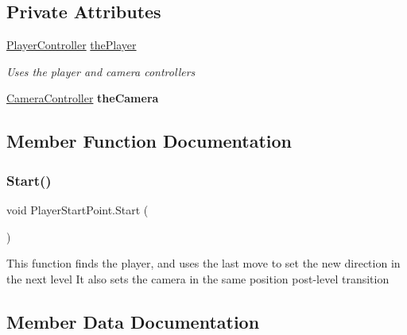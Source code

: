 \subsection*{Private Attributes}
\begin{DoxyCompactItemize}
\item 
\mbox{\hyperlink{class_player_controller}{Player\+Controller}} \mbox{\hyperlink{class_player_start_point_a4242b06d9f40b1729a83ffb3508772c4}{the\+Player}}
\begin{DoxyCompactList}\small\item\em Uses the player and camera controllers \end{DoxyCompactList}\item 
\mbox{\label{class_player_start_point_af4e288ae79aa800dfeb6ca7013052db1}} 
\mbox{\hyperlink{class_camera_controller}{Camera\+Controller}} {\bfseries the\+Camera}
\end{DoxyCompactItemize}


\subsection{Member Function Documentation}
\mbox{\label{class_player_start_point_a54401d0571e76bb7a7a3161a0147b787}} 
\subsubsection{\texorpdfstring{Start()}{Start()}}
{\footnotesize\ttfamily void Player\+Start\+Point.\+Start (\begin{DoxyParamCaption}{ }\end{DoxyParamCaption})\hspace{0.3cm}{\ttfamily [private]}}



This function finds the player, and uses the last move to set the new direction in the next level It also sets the camera in the same position post-\/level transition 



\subsection{Member Data Documentation}
\mbox{\label{class_player_start_point_abdc8a9f45e6064dad9a93c60e29a4832}} 
